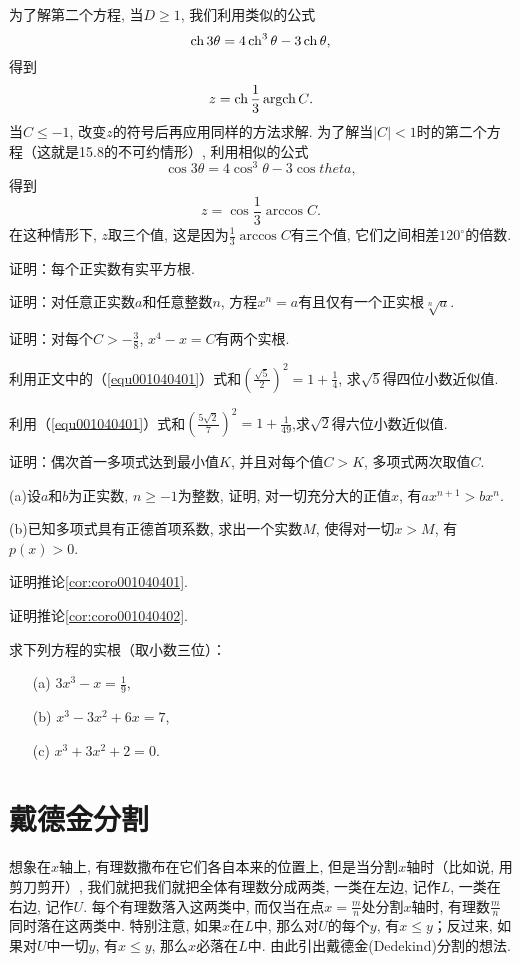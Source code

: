 为了解第二个方程, 当$D \ge 1$, 我们利用类似的公式
\[
\operatorname{ch}{3\theta} = 4\operatorname{ch}^3{\theta} -3\operatorname{ch}{\theta},
\]
得到
\[
z = \operatorname{ch}{\frac{1}{3}\operatorname{argch}{C}}.
\]
当$C \le -1$, 改变$z$的符号后再应用同样的方法求解. 为了解当$|C|<1$时的第二个方程（这就是15.8的不可约情形）, 利用相似的公式
\[
\cos{3\theta} = 4\cos^3{\theta}-3\cos{theta},
\]
得到
\[
z = \cos{\frac{1}{3}\arccos{C}}.
\]
在这种情形下, $z$取三个值, 这是因为$\frac{1}{3}\arccos{C}$有三个值, 它们之间相差$120^\circ$的倍数. 

\begin{problemset}
\item 证明：每个正实数有实平方根. 

\item 证明：对任意正实数$a$和任意整数$n$, 方程$x^n=a$有且仅有一个正实根$\sqrt[n]{a}$.

\item 证明：对每个$C > -\frac{3}{8}$, $x^4-x=C$有两个实根. 

\item 利用正文中的（\ref{equ001040401}）式和$(\frac{\sqrt{5}}{2})^2 = 1 + \frac{1}{4}$, 求$\sqrt{5}$得四位小数近似值. 

\item 利用（\ref{equ001040401}）式和$(\frac{5\sqrt{2}}{7})^2 = 1 + \frac{1}{49}$,求$\sqrt{2}$得六位小数近似值. 

\item 证明：偶次首一多项式达到最小值$K$, 并且对每个值$C>K$, 多项式两次取值$C$.

\item (a)设$a$和$b$为正实数, $n \ge -1$为整数, 证明, 对一切充分大的正值$x$, 有$ax^{n+1} > bx^n$.

(b)已知多项式具有正德首项系数, 求出一个实数$M$, 使得对一切$x > M$, 有$p(x)>0$.

\item 证明推论\ref{cor:coro001040401}.

\item 证明推论\ref{cor:coro001040402}.

\item 求下列方程的实根（取小数三位）：
\begin{enumerate}
\item[(a)]$3x^3 - x = \frac{1}{9}$,
\item[(b)]$x^3 - 3x^2 + 6x = 7$,
\item[(c)]$x^3+3x^2+2=0$.
\end{enumerate}
\end{problemset}


\section{戴德金分割}\label{section0010405}
想象在$x$轴上, 有理数撒布在它们各自本来的位置上, 但是当分割$x$轴时（比如说, 用剪刀剪开）, 我们就把我们就把全体有理数分成两类, 一类在左边, 记作$L$, 一类在右边, 记作$U$. 每个有理数落入这两类中, 而仅当在点$x = \frac{m}{n}$处分割$x$轴时, 有理数$\frac{m}{n}$同时落在这两类中. 特别注意, 如果$x$在$L$中, 那么对$U$的每个$y$, 有$x \le y$；反过来, 如果对$U$中一切$y$, 有$x \le y$, 那么$x$必落在$L$中. 由此引出戴德金(Dedekind)分割的想法.  

